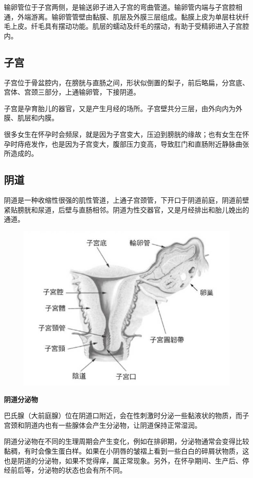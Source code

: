 \documentclass[12pt,UTF8]{ctexbook}
\begin{document}
输卵管位于子宫两侧，是输送卵子进入子宫的弯曲管道。输卵管内端与子宫腔相通，外端游离。输卵管管壁由黏膜、肌层及外膜三层组成。黏膜上皮为单层柱状纤毛上皮。纤毛具有摆动功能。肌层的蠕动及纤毛的摆动，有助于受精卵进入子宫腔内。

\subsection{子宫}

子宫位于骨盆腔内，在膀胱与直肠之间，形状似倒置的梨子，前后略扁，分宫底、宫体、宫颈三部分，上通输卵管，下接阴道。

子宫是孕育胎儿的器官，又是产生月经的场所。子宫壁共分三层，由外向内为外膜、肌层和内膜。

很多女生在怀孕时会频尿，就是因为子宫变大，压迫到膀胱的缘故；也有女生在怀孕时痔疮发作，也是因为子宫变大，腹部压力变高，导致肛门和直肠附近静脉曲张所造成的。

\subsection{阴道}

阴道是一种收缩性很强的肌性管道，上通子宫颈管，下开口于阴道前庭，阴道前壁紧贴膀胱和尿道，后壁与直肠相邻。阴道为性交器官，又是月经排出和胎儿娩出的通道。

\begin{figure}[H]
	\centering
	\includegraphics[width=0.7\linewidth]{3}
	\caption{}
\end{figure}

\textbf{阴道分泌物}

巴氏腺（大前庭腺）位在阴道口附近，会在性刺激时分泌一些黏液状的物质，而子宫颈和阴道内也有一些腺体会产生分泌物，让阴道保持正常湿润。

阴道分泌物在不同的生理周期会产生变化，例如在排卵期，分泌物通常会变得比较黏稠，有时会像生蛋白样。如果在小阴唇的皱褶上看到一些白白的碎屑状物质，这也是阴道的分泌物，如果不觉得痒，属正常现象。另外，在怀孕期间、生产后、停经前后等，分泌物的状态也会有所不同。
\end{document}
